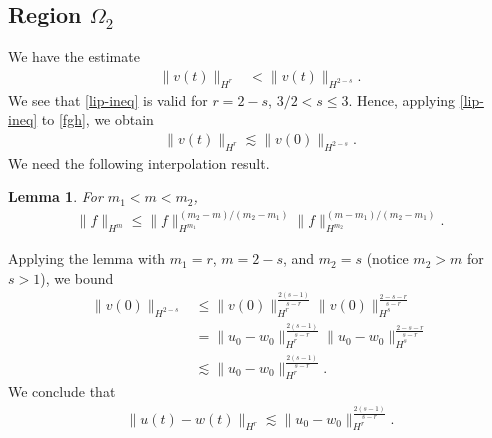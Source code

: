 \documentclass[12pt,reqno]{amsart}
\numberwithin{equation}{section}  %
\numberwithin{figure}{section}
\newtheorem{lemma}{Lemma}
\begin{document}
\subsection{Region $\Omega_{2}$} 
\label{ssec:case-4}
%
We have the estimate
\begin{equation}
  \label{fgh}
\begin{split}
  \| v(t) \|_{H^{r}}
  & < \|v(t) \|_{H^{2-s}}.
    \end{split}
\end{equation}
%
We see that \eqref{lip-ineq} is valid for $r = 2-s$, $3/2 < s \le 3$.
Hence, applying \eqref{lip-ineq} to \eqref{fgh}, we obtain 
%
%
%
%
\begin{equation*}
\begin{split}
\| v(t) \|_{H^{r}}
 \lesssim \|v(0) \|_{H^{2-s}}.
\end{split}
\end{equation*}
%
%
%
%
%
We need the following interpolation
result. 
%
%
%
%
%
%
%
%
\begin{lemma}
  For $m_{1} < m < m_{2}$,
  \begin{equation*}
  \begin{split}
    \| f \|_{H^{m}} \le \| f \|_{H^{m_{1}}}^{(m_{2}-m)/(m_{2} - m_{1})} \| f
    \|_{H^{m_{2}}}^{(m -m_{1})/(m_{2} - m_{1})}.
  \end{split}
  \end{equation*}
\label{lem:interp}
\end{lemma}
%
Applying the lemma with $m_{1} =r$, $m = 2-s$, and $m_{2} = s$ (notice
$m_{2} > m$ for $s > 1$), we bound 
%
%
\begin{equation*}
\begin{split}
    \| v(0) \|_{H^{2-s}} 
    & \le \| v(0) \|_{H^{r}}^{\frac{2(s-1)}{s-r}} \|v(0)
  \|_{H^{s}}^{\frac{2-s-r}{s-r}}
  \\
  & = \| u_{0} - w_{0} \|_{H^{r}}^{\frac{2(s-1)}{s-r}} \|u_{0} - w_{0}
  \|_{H^{s}}^{\frac{2-s-r}{s-r}}
  \\
  & \lesssim \| u_{0} - w_{0} \|_{H^{r}}^{\frac{2(s-1)}{s-r}}.
\end{split}
\end{equation*}
%
We conclude that
%
%
\begin{equation*}
\begin{split}
  \| u(t) - w(t) \|_{H^{r}} \lesssim \|u_{0} - w_{0} \|_{H^{r}}^{\frac{2(s-1)}{s-r}}.
\end{split}
\end{equation*}
%
%
%
%
\end{document}
